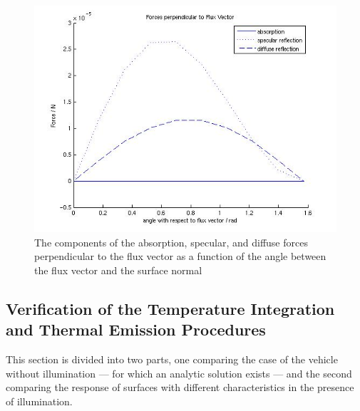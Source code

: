 \begin{description}
    \begin{figure}[!ht]
        \includegraphics[width=180mm]{figs/Fsda/forces_perpendicular.jpg}
        \caption{The components of the absorption, specular, and diffuse forces
        perpendicular to the flux vector as a function of the angle between the
        flux vector and the surface normal}
        \label{fig:ivv_F_asd_values_perp}
    \end{figure}
  \end{description}

  \clearpage

\subsection{Verification of the Temperature Integration and Thermal
Emission Procedures}\label{test:temperature}

  This section is divided into two parts, one comparing the case of
  the vehicle without illumination --- for which an analytic solution
  exists --- and the second comparing the response of surfaces with different
  characteristics in the presence of illumination.

